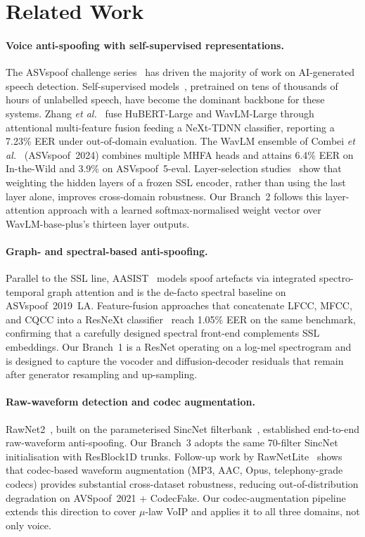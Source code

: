 \documentclass[10pt,twocolumn,a4paper]{article}
\begin{document}
\section{Related Work}
\label{sec:related}

\paragraph{Voice anti-spoofing with self-supervised representations.}
The ASVspoof challenge series~\cite{asvspoof2019,asvspoof2021,asvspoof5} has driven the majority of work on AI-generated speech detection. Self-supervised models~\cite{wav2vec2,hubert,wavlm}, pretrained on tens of thousands of hours of unlabelled speech, have become the dominant backbone for these systems. Zhang \textit{et al.}~\cite{amff_nexttdnn_2025} fuse HuBERT-Large and WavLM-Large through attentional multi-feature fusion feeding a NeXt-TDNN classifier, reporting a 7.23\% EER under out-of-domain evaluation. The WavLM ensemble of Combei \textit{et al.}~\cite{combei2024_wavlm_ensemble} (ASVspoof~2024) combines multiple MHFA heads and attains 6.4\% EER on In-the-Wild and 3.9\% on ASVspoof~5-eval. Layer-selection studies~\cite{ssl_layer_fusion_2025} show that weighting the hidden layers of a frozen SSL encoder, rather than using the last layer alone, improves cross-domain robustness. Our Branch~2 follows this layer-attention approach with a learned softmax-normalised weight vector over WavLM-base-plus's thirteen layer outputs.

\paragraph{Graph- and spectral-based anti-spoofing.}
Parallel to the SSL line, AASIST~\cite{aasist} models spoof artefacts via integrated spectro-temporal graph attention and is the de-facto spectral baseline on ASVspoof~2019~LA. Feature-fusion approaches that concatenate LFCC, MFCC, and CQCC into a ResNeXt classifier~\cite{resnext_spectral_2025} reach 1.05\% EER on the same benchmark, confirming that a carefully designed spectral front-end complements SSL embeddings. Our Branch~1 is a ResNet operating on a log-mel spectrogram and is designed to capture the vocoder and diffusion-decoder residuals that remain after generator resampling and up-sampling.

\paragraph{Raw-waveform detection and codec augmentation.}
RawNet2~\cite{rawnet2}, built on the parameterised SincNet filterbank~\cite{sincnet}, established end-to-end raw-waveform anti-spoofing. Our Branch~3 adopts the same 70-filter SincNet initialisation with ResBlock1D trunks. Follow-up work by RawNetLite~\cite{rawnetlite_2025} shows that codec-based waveform augmentation (MP3, AAC, Opus, telephony-grade codecs) provides substantial cross-dataset robustness, reducing out-of-distribution degradation on AVSpoof~2021 + CodecFake. Our codec-augmentation pipeline extends this direction to cover $\mu$-law VoIP and applies it to all three domains, not only voice.
\end{document}
